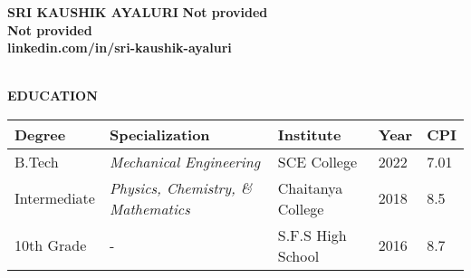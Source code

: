 \documentclass[a4paper,10pt]{article}
\newcommand{\resheading}[1]{%
  \vspace{1em}%
  \noindent\colorbox{mygrey}{%
    \parbox{\dimexpr\linewidth-2\fboxsep\relax}{%
      \textbf{#1}%
    }%
  }%
  \vspace{0.6em}%
}
\begin{document}
\vspace*{-1.5cm}
\noindent

\textbf{SRI KAUSHIK AYALURI} \hspace{9.6cm} {\bf Not provided}\\
  \hspace{9.1cm} {\bf Not provided} \\
  \hspace{7.9cm} {\bf linkedin.com/in/sri-kaushik-ayaluri} \\
 \\


\resheading{EDUCATION}
\vspace{0.4em}
\begin{tabular}{ p{2.5cm} @{\hskip 0.15in} p{5.5cm} @{\hskip 0.15in} p{3.5cm} @{\hskip 0.15in} p{2.5cm} @{\hskip 0.15in} p{1.5cm} }
\toprule
\textbf{Degree} & \textbf{Specialization} & \textbf{Institute} & \textbf{Year} & \textbf{CPI} \\
\midrule
B.Tech & \textit{Mechanical Engineering} & SCE College & 2022 & 7.01 \\
Intermediate & \textit{Physics, Chemistry, \& Mathematics} & Chaitanya College & 2018 & 8.5 \\
10th Grade & - & S.F.S High School & 2016 & 8.7 \\
\bottomrule
\end{tabular}
\end{document}
